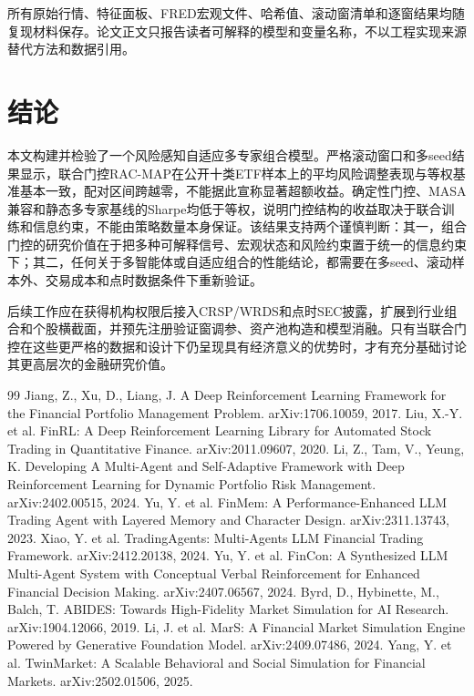 \documentclass[UTF8,a4paper,zihao=-4]{ctexart}
\begin{document}
所有原始行情、特征面板、FRED宏观文件、哈希值、滚动窗清单和逐窗结果均随复现材料保存。论文正文只报告读者可解释的模型和变量名称，不以工程实现来源替代方法和数据引用。

\section{结论}
本文构建并检验了一个风险感知自适应多专家组合模型。严格滚动窗口和多seed结果显示，联合门控RAC-MAP在公开十类ETF样本上的平均风险调整表现与等权基准基本一致，配对区间跨越零，不能据此宣称显著超额收益。确定性门控、MASA兼容和静态多专家基线的Sharpe均低于等权，说明门控结构的收益取决于联合训练和信息约束，不能由策略数量本身保证。该结果支持两个谨慎判断：其一，组合门控的研究价值在于把多种可解释信号、宏观状态和风险约束置于统一的信息约束下；其二，任何关于多智能体或自适应组合的性能结论，都需要在多seed、滚动样本外、交易成本和点时数据条件下重新验证。

后续工作应在获得机构权限后接入CRSP/WRDS和点时SEC披露，扩展到行业组合和个股横截面，并预先注册验证窗调参、资产池构造和模型消融。只有当联合门控在这些更严格的数据和设计下仍呈现具有经济意义的优势时，才有充分基础讨论其更高层次的金融研究价值。


\begin{thebibliography}{99}
 Jiang, Z., Xu, D., Liang, J. A Deep Reinforcement Learning Framework for the Financial Portfolio Management Problem. arXiv:1706.10059, 2017.
 Liu, X.-Y. et al. FinRL: A Deep Reinforcement Learning Library for Automated Stock Trading in Quantitative Finance. arXiv:2011.09607, 2020.
 Li, Z., Tam, V., Yeung, K. Developing A Multi-Agent and Self-Adaptive Framework with Deep Reinforcement Learning for Dynamic Portfolio Risk Management. arXiv:2402.00515, 2024.
 Yu, Y. et al. FinMem: A Performance-Enhanced LLM Trading Agent with Layered Memory and Character Design. arXiv:2311.13743, 2023.
 Xiao, Y. et al. TradingAgents: Multi-Agents LLM Financial Trading Framework. arXiv:2412.20138, 2024.
 Yu, Y. et al. FinCon: A Synthesized LLM Multi-Agent System with Conceptual Verbal Reinforcement for Enhanced Financial Decision Making. arXiv:2407.06567, 2024.
 Byrd, D., Hybinette, M., Balch, T. ABIDES: Towards High-Fidelity Market Simulation for AI Research. arXiv:1904.12066, 2019.
 Li, J. et al. MarS: A Financial Market Simulation Engine Powered by Generative Foundation Model. arXiv:2409.07486, 2024.
 Yang, Y. et al. TwinMarket: A Scalable Behavioral and Social Simulation for Financial Markets. arXiv:2502.01506, 2025.
\end{thebibliography}
\end{document}
